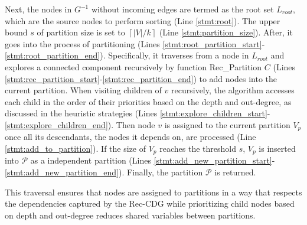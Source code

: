 Next, the nodes in $G^{-1}$ without incoming edges are termed as the root set $L_{root}$, which are the source nodes to perform sorting (Line \ref{stmt:root}). The upper bound $s$ of partition size is set to $\left\lceil {|V|}/{k} \right\rceil$ (Line \ref{stmt:partition_size}). After, it goes into the process of partitioning  (Lines \ref{stmt:root_partition_start}-\ref{stmt:root_partition_end}).  Specifically, it traverses from a node in $L_{root}$ and explores a connected component recursively by function Rec\_Partition $C$ (Lines \ref{stmt:rec_partition_start}-\ref{stmt:rec_partition_end}) to add nodes into the current partition. When visiting children of $v$ recursively, the algorithm accesses each child in the order of their priorities based on the depth and out-degree, as discussed in the heuristic strategies (Lines \ref{stmt:explore_children_start}-\ref{stmt:explore_children_end}). Then node $v$ is assigned to the current partition $V_p$ once all its descendants, the nodes it depends on, are processed (Line \ref{stmt:add_to_partition}). If the size of $V_p$ reaches the threshold $s$, $V_p$ is inserted into $\mathcal{P}$ as a independent partition (Lines \ref{stmt:add_new_partition_start}-\ref{stmt:add_new_partition_end}). Finally, the partition $\mathcal{P}$ is returned. 

This traversal ensures that nodes are assigned to partitions in a way that respects the dependencies captured by the Rec-CDG while prioritizing child nodes based on depth and out-degree reduces shared variables between partitions.








